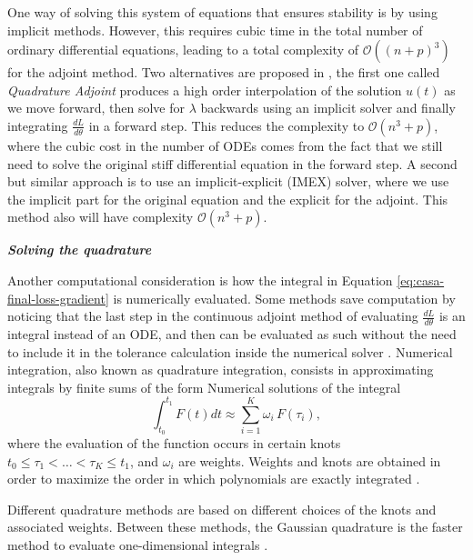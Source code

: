 One way of solving this system of equations that ensures stability is by using implicit methods. 
However, this requires cubic time in the total number of ordinary differential equations, leading to a total complexity of $\mathcal O((n+p)^3)$ for the adjoint method.
Two alternatives are proposed in \cite{kim_stiff_2021}, the first one called \textit{Quadrature Adjoint} produces a high order interpolation of the solution $u(t)$ as we move forward, then solve for $\lambda$ backwards using an implicit solver and finally integrating $\frac{dL}{d\theta}$ in a forward step.
This reduces the complexity to $\mathcal O (n^3 + p)$, where the cubic cost in the number of ODEs comes from the fact that we still need to solve the original stiff differential equation in the forward step. 
A second but similar approach is to use an implicit-explicit (IMEX) solver, where we use the implicit part for the original equation and the explicit for the adjoint. 
This method also will have complexity $\mathcal O (n^3 + p)$.

\vspace*{10px}
\noindent \textbf{\textit{Solving the quadrature}}
\vspace*{5px}

Another computational consideration is how the integral in Equation \eqref{eq:casa-final-loss-gradient} is numerically evaluated. 
Some methods save computation by noticing that the last step in the continuous adjoint method of evaluating $\frac{dL}{d\theta}$ is an integral instead of an ODE, and then can be evaluated as such without the need to include it in the tolerance calculation inside the numerical solver \autocite{that-is-not-an-ode}.
Numerical integration, also known as quadrature integration, consists in approximating integrals by finite sums of the form
Numerical solutions of the integral 
\begin{equation}
    \int_{t_0}^{t_1} 
    F(t) dt
    \approx
    \sum_{i=1}^K \omega_i \, F(\tau_i),
\end{equation}
where the evaluation of the function occurs in certain knots $t_0 \leq \tau_1 < \ldots < \tau_K \leq t_1$, and $\omega_i$ are weights. 
Weights and knots are obtained in order to maximize the order in which polynomials are exactly integrated \cite{stoer2002-numerical}. 

Different quadrature methods are based on different choices of the knots and associated weights.
Between these methods, the Gaussian quadrature is the faster method to evaluate one-dimensional integrals \cite{Norcliffe_gaussquadrature_2023}.


